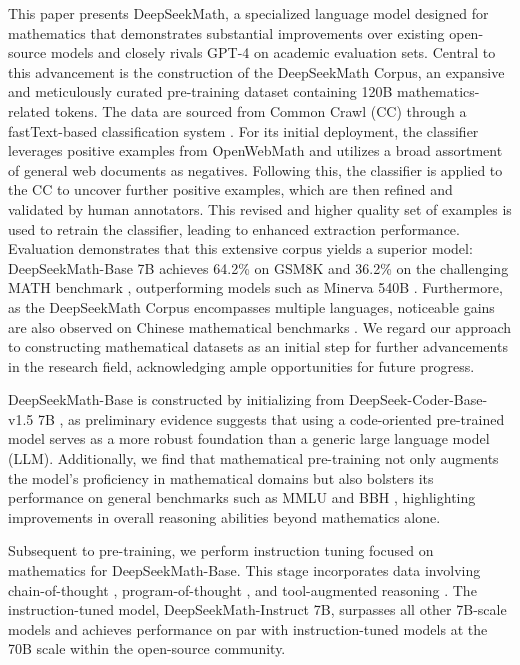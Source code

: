 This paper presents DeepSeekMath, a specialized language model designed for mathematics that demonstrates substantial improvements over existing open-source models and closely rivals GPT-4 on academic evaluation sets. Central to this advancement is the construction of the DeepSeekMath Corpus, an expansive and meticulously curated pre-training dataset containing 120B mathematics-related tokens. The data are sourced from Common Crawl (CC) through a fastText-based classification system \citep{joulin2016fasttext}. For its initial deployment, the classifier leverages positive examples from OpenWebMath \citep{openwebmath} and utilizes a broad assortment of general web documents as negatives. Following this, the classifier is applied to the CC to uncover further positive examples, which are then refined and validated by human annotators. This revised and higher quality set of examples is used to retrain the classifier, leading to enhanced extraction performance. Evaluation demonstrates that this extensive corpus yields a superior model: DeepSeekMath-Base 7B achieves 64.2\% on GSM8K \citep{gsm8k} and 36.2\% on the challenging MATH benchmark \citep{MATH}, outperforming models such as Minerva 540B \citep{minerva}. Furthermore, as the DeepSeekMath Corpus encompasses multiple languages, noticeable gains are also observed on Chinese mathematical benchmarks \citep{wei2023cmath,agieval}. We regard our approach to constructing mathematical datasets as an initial step for further advancements in the research field, acknowledging ample opportunities for future progress.

DeepSeekMath-Base is constructed by initializing from DeepSeek-Coder-Base-v1.5 7B \citep{deepseek-coder}, as preliminary evidence suggests that using a code-oriented pre-trained model serves as a more robust foundation than a generic large language model (LLM). Additionally, we find that mathematical pre-training not only augments the model's proficiency in mathematical domains but also bolsters its performance on general benchmarks such as MMLU \citep{mmlu} and BBH \citep{bbh}, highlighting improvements in overall reasoning abilities beyond mathematics alone.

Subsequent to pre-training, we perform instruction tuning focused on mathematics for DeepSeekMath-Base. This stage incorporates data involving chain-of-thought \citep{cot}, program-of-thought \citep{pot,pal}, and tool-augmented reasoning \citep{tora}. The instruction-tuned model, DeepSeekMath-Instruct 7B, surpasses all other 7B-scale models and achieves performance on par with instruction-tuned models at the 70B scale within the open-source community.

